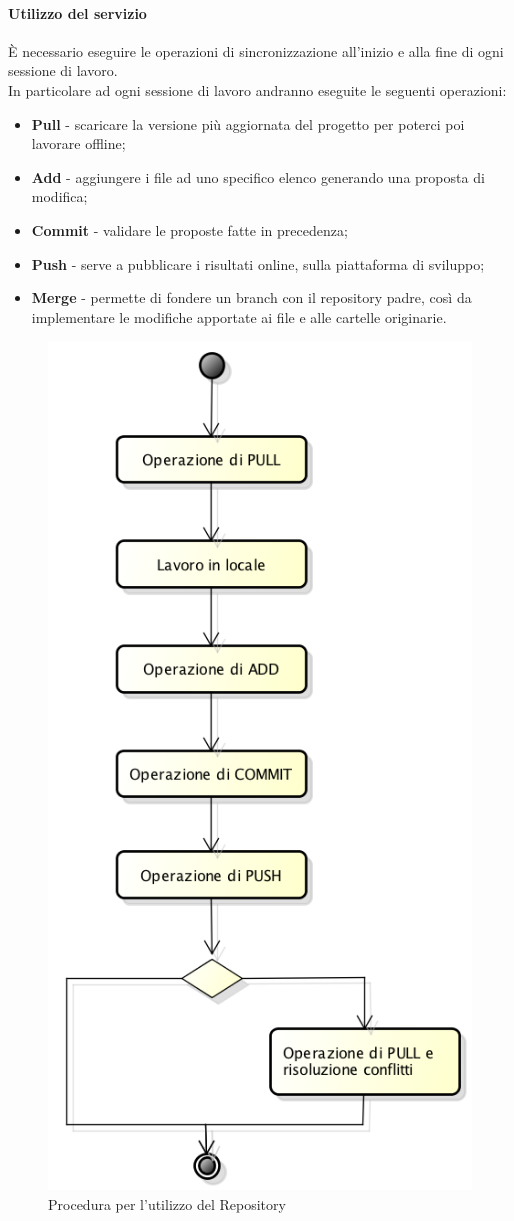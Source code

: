 \paragraph{Utilizzo del servizio}
È necessario eseguire le operazioni di sincronizzazione all'inizio e alla fine di ogni sessione di lavoro. \\
In particolare ad ogni sessione di lavoro andranno eseguite le seguenti operazioni:
\begin{itemize}
	\item \textbf{Pull} - scaricare la versione più aggiornata del progetto per poterci poi lavorare offline;
	\item \textbf{Add} - aggiungere i file ad uno specifico elenco generando una proposta di modifica;
	\item \textbf{Commit} - validare le proposte fatte in precedenza;
	\item \textbf{Push} - serve a pubblicare i risultati online, sulla piattaforma di sviluppo;
	\item \textbf{Merge} - permette di fondere un \gls{branch} con il \gls{repository} padre, così da implementare le modifiche apportate ai file e alle cartelle originarie.
\end{itemize}
\begin{figure}[h]
\centering
\includegraphics[width=0.5\linewidth]{img/proceduraRepository}
\caption[Procedura per l'utilizzo del Repository]{Procedura per l'utilizzo del Repository}
\label{fig:proceduraRepository}
\end{figure}

